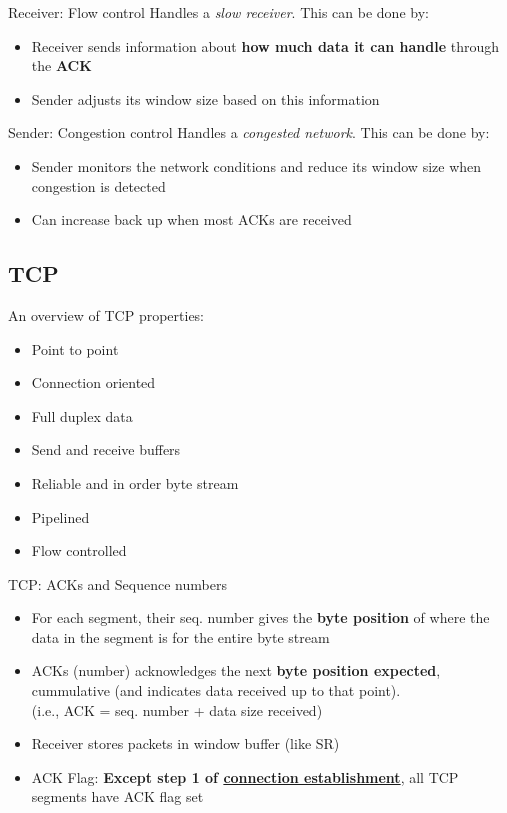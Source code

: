 
\begin{definition}
    {Receiver: Flow control}
    Handles a \textit{slow receiver}. This can be done by:
    \begin{itemize}
        \item Receiver sends information about \textbf{how much data it can handle} through the \textbf{ACK}
        \item Sender adjusts its window size based on this information
    \end{itemize}
\end{definition}

\begin{definition}
    {Sender: Congestion control}
    Handles a \textit{congested network}. This can be done by:
    \begin{itemize}
        \item Sender monitors the network conditions and reduce its window size when congestion is detected
        \item Can increase back up when most ACKs are received
    \end{itemize}
\end{definition}

\subsection{TCP}

An overview of TCP properties:

\begin{itemize}
    \item Point to point
    \item Connection oriented
    \item Full duplex data
    \item Send and receive buffers
    \item Reliable and in order byte stream
    \item Pipelined
    \item Flow controlled
\end{itemize}


\begin{definition}
    {TCP: ACKs and Sequence numbers}
    \begin{itemize}
        \item For each segment, their seq. number gives the \textbf{byte position} of where the data in the segment is for the entire byte stream
        \item ACKs (number) acknowledges the next \textbf{byte position expected}, cummulative (and indicates data received up to that point).
              \\(i.e., ACK = seq. number + data size received)
        \item Receiver stores packets in window buffer (like SR)
        \item ACK Flag: \textbf{Except step 1 of \hyperref[sec:m04-l08]{connection establishment}}, all TCP segments have ACK flag set
    \end{itemize}
\end{definition}

